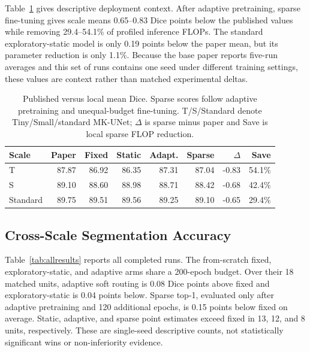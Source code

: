 \documentclass[conference]{IEEEtran}
\begin{document}
Table~\ref{tab:papercomparison} gives descriptive deployment context. After adaptive pretraining, sparse fine-tuning gives scale means 0.65--0.83 Dice points below the published values while removing 29.4--54.1\% of profiled inference FLOPs. The standard exploratory-static model is only 0.19 points below the paper mean, but its parameter reduction is only 1.1\%. Because the base paper reports five-run averages and this set of runs contains one seed under different training settings, these values are context rather than matched experimental deltas.

\begin{table}[t]
\caption{Published versus local mean Dice. Sparse scores follow adaptive pretraining and unequal-budget fine-tuning. T/S/Standard denote Tiny/Small/standard MK-UNet; $\Delta$ is sparse minus paper and Save is local sparse FLOP reduction.}
\label{tab:papercomparison}
\centering
\scriptsize
\setlength{\tabcolsep}{3.2pt}
\begin{tabular}{lrrrrrrr}
\toprule
Scale & Paper & Fixed & Static & Adapt. & Sparse & $\Delta$ & Save \\
\midrule
T    & 87.87 & 86.92 & 86.35 & 87.31 & 87.04 & -0.83 & 54.1\% \\
S    & 89.10 & 88.60 & 88.98 & 88.71 & 88.42 & -0.68 & 42.4\% \\
Standard & 89.75 & 89.51 & 89.56 & 89.25 & 89.10 & -0.65 & 29.4\% \\
\bottomrule
\end{tabular}
\end{table}

\subsection{Cross-Scale Segmentation Accuracy}
Table~\ref{tab:allresults} reports all completed runs. The from-scratch fixed, exploratory-static, and adaptive arms share a 200-epoch budget. Over their 18 matched units, adaptive soft routing is 0.08 Dice points above fixed and exploratory-static is 0.04 points below. Sparse top-1, evaluated only after adaptive pretraining and 120 additional epochs, is 0.15 points below fixed on average. Static, adaptive, and sparse point estimates exceed fixed in 13, 12, and 8 units, respectively. These are single-seed descriptive counts, not statistically significant wins or non-inferiority evidence.
\end{document}
